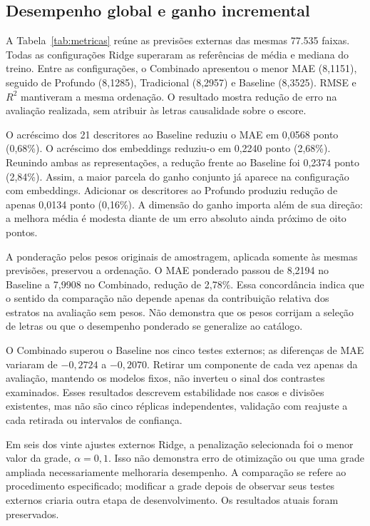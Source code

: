 \subsection{Desempenho global e ganho incremental}
A Tabela~\ref{tab:metricas} reúne as previsões externas das mesmas 77.535 faixas. Todas as configurações Ridge superaram as referências de média e mediana do treino. Entre as configurações, o Combinado apresentou o menor MAE (8,1151), seguido de Profundo (8,1285), Tradicional (8,2957) e Baseline (8,3525). RMSE e $R^2$ mantiveram a mesma ordenação. O resultado mostra redução de erro na avaliação realizada, sem atribuir às letras causalidade sobre o escore.



O acréscimo dos 21 descritores ao Baseline reduziu o MAE em 0,0568 ponto (0,68\%). O acréscimo dos embeddings reduziu-o em 0,2240 ponto (2,68\%). Reunindo ambas as representações, a redução frente ao Baseline foi 0,2374 ponto (2,84\%). Assim, a maior parcela do ganho conjunto já aparece na configuração com embeddings. Adicionar os descritores ao Profundo produziu redução de apenas 0,0134 ponto (0,16\%). A dimensão do ganho importa além de sua direção: a melhora média é modesta diante de um erro absoluto ainda próximo de oito pontos.

A ponderação pelos pesos originais de amostragem, aplicada somente às mesmas previsões, preservou a ordenação. O MAE ponderado passou de 8,2194 no Baseline a 7,9908 no Combinado, redução de 2,78\%. Essa concordância indica que o sentido da comparação não depende apenas da contribuição relativa dos estratos na avaliação sem pesos. Não demonstra que os pesos corrijam a seleção de letras ou que o desempenho ponderado se generalize ao catálogo.

O Combinado superou o Baseline nos cinco testes externos; as diferenças de MAE variaram de $-0,2724$ a $-0,2070$. Retirar um componente de cada vez apenas da avaliação, mantendo os modelos fixos, não inverteu o sinal dos contrastes examinados. Esses resultados descrevem estabilidade nos casos e divisões existentes, mas não são cinco réplicas independentes, validação com reajuste a cada retirada ou intervalos de confiança.

Em seis dos vinte ajustes externos Ridge, a penalização selecionada foi o menor valor da grade, $\alpha=0,1$. Isso não demonstra erro de otimização ou que uma grade ampliada necessariamente melhoraria desempenho. A comparação se refere ao procedimento especificado; modificar a grade depois de observar seus testes externos criaria outra etapa de desenvolvimento. Os resultados atuais foram preservados.


